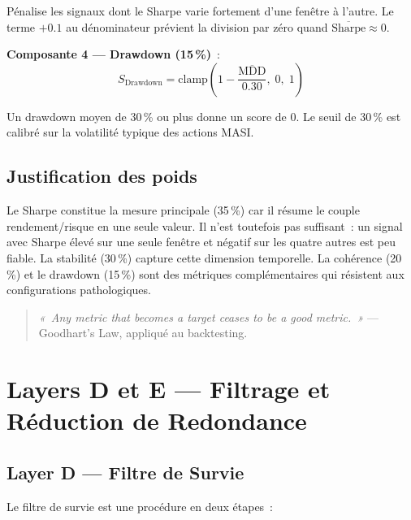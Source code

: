 Pénalise les signaux dont le Sharpe varie fortement d'une fenêtre à l'autre.
Le terme $+0.1$ au dénominateur prévient la division par zéro quand
$\overline{\text{Sharpe}} \approx 0$.

\textbf{Composante 4 — Drawdown (15\,\%)}~:
\begin{equation}
S_{\text{Drawdown}} = \text{clamp}\!\left(1 - \frac{\overline{\text{MDD}}}{0.30},\; 0,\; 1\right)
\label{eq:drawdown_score}
\end{equation}

Un drawdown moyen de 30\,\% ou plus donne un score de 0. Le seuil de 30\,\% est
calibré sur la volatilité typique des actions MASI.

\subsection{Justification des poids}

Le Sharpe constitue la mesure principale (35\,\%) car il résume le couple rendement/risque
en une seule valeur. Il n'est toutefois pas suffisant~: un signal avec Sharpe élevé sur
une seule fenêtre et négatif sur les quatre autres est peu fiable. La stabilité (30\,\%)
capture cette dimension temporelle. La cohérence (20\,\%) et le drawdown (15\,\%) sont
des métriques complémentaires qui résistent aux configurations pathologiques.

\begin{quote}
\textit{«~Any metric that becomes a target ceases to be a good metric.~»}
— Goodhart's Law, appliqué au backtesting.
\end{quote}

\section{Layers D et E --- Filtrage et Réduction de Redondance}
\label{sec:layers_de}

\subsection{Layer D — Filtre de Survie}

Le filtre de survie est une procédure en deux étapes~:

